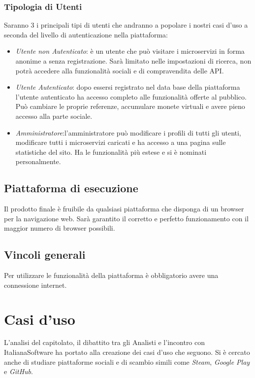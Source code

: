 \documentclass[12pt,a4paper,titlepage]{article}
\begin{document}
	\subsubsection{Tipologia di Utenti}
	Saranno 3 i principali tipi di utenti che andranno a popolare i nostri casi d'uso a seconda del livello di autenticazione nella piattaforma:
	\begin{itemize}
		\item \textit{Utente non Autenticato}: è un utente che può visitare i microservizi in forma anonime a senza registrazione. Sarà limitato nelle impostazioni di ricerca, non potrà accedere alla funzionalità sociali e di compravendita delle API.
		\item \textit{Utente Autenticato}: dopo essersi registrato nel data base della piattaforma l'utente autenticato ha accesso completo alle funzionalità offerte al pubblico. Può cambiare le proprie referenze, accumulare monete virtuali e avere pieno accesso alla parte sociale. 
		\item \textit{Amministratore}:l'amministratore può modificare i profili di tutti gli utenti, modificare tutti i microservizi caricati e ha accesso a una pagina sulle statistiche del sito. Ha le funzionalità più estese e si è nominati personalmente. 
	\end{itemize}
	
	
	
	\subsection{Piattaforma di esecuzione}
	Il prodotto finale è fruibile da qualsiasi piattaforma che disponga di un browser per la navigazione web. Sarà garantito il corretto e perfetto funzionamento con il maggior numero di browser possibili. 

	\subsection{Vincoli generali}
	Per utilizzare le funzionalità della piattaforma è obbligatorio avere una connessione internet.
	\newpage
	
	\section{Casi d'uso}
	L'analisi del capitolato, il dibattito tra gli Analisti e l'incontro con ItalianaSoftware ha portato alla creazione dei casi d'uso che seguono. Si è cercato anche di studiare piattaforme sociali e di scambio simili come \textit{Steam}, \textit{Google Play} e \textit{GitHub}.
	
\end{document}

